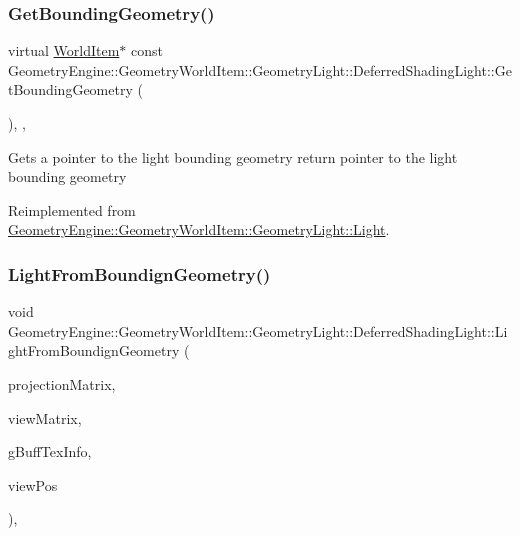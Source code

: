 \subsubsection{\texorpdfstring{GetBoundingGeometry()}{GetBoundingGeometry()}}
{\footnotesize\ttfamily virtual \mbox{\hyperlink{class_geometry_engine_1_1_geometry_world_item_1_1_world_item}{World\+Item}}$\ast$ const Geometry\+Engine\+::\+Geometry\+World\+Item\+::\+Geometry\+Light\+::\+Deferred\+Shading\+Light\+::\+Get\+Bounding\+Geometry (\begin{DoxyParamCaption}{ }\end{DoxyParamCaption})\hspace{0.3cm}{\ttfamily [inline]}, {\ttfamily [override]}, {\ttfamily [virtual]}}

Gets a pointer to the light bounding geometry return pointer to the light bounding geometry 

Reimplemented from \mbox{\hyperlink{class_geometry_engine_1_1_geometry_world_item_1_1_geometry_light_1_1_light_a53cc9a8e7ab6eab9d34f1655ef33eaef}{Geometry\+Engine\+::\+Geometry\+World\+Item\+::\+Geometry\+Light\+::\+Light}}.

\mbox{\label{class_geometry_engine_1_1_geometry_world_item_1_1_geometry_light_1_1_deferred_shading_light_a2071d92505a56dfb846b87c2aca9b94b}} 
\subsubsection{\texorpdfstring{LightFromBoundignGeometry()}{LightFromBoundignGeometry()}}
{\footnotesize\ttfamily void Geometry\+Engine\+::\+Geometry\+World\+Item\+::\+Geometry\+Light\+::\+Deferred\+Shading\+Light\+::\+Light\+From\+Boundign\+Geometry (\begin{DoxyParamCaption}\item[{const Q\+Matrix4x4 \&}]{projection\+Matrix,  }\item[{const Q\+Matrix4x4 \&}]{view\+Matrix,  }\item[{const \mbox{\hyperlink{struct_geometry_engine_1_1_g_buffer_texture_info}{G\+Buffer\+Texture\+Info}} \&}]{g\+Buff\+Tex\+Info,  }\item[{const Q\+Vector3D \&}]{view\+Pos }\end{DoxyParamCaption})\hspace{0.3cm}{\ttfamily [override]}, {\ttfamily [virtual]}}

